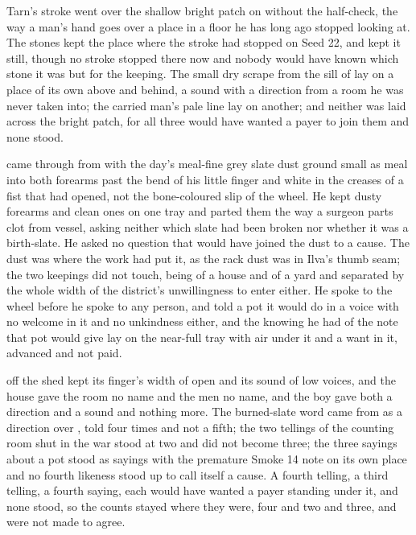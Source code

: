 \scenebreak

Tarn's stroke went over the shallow bright patch on  without the half-check, the way a man's hand goes over a place in a floor he has long ago stopped looking at. The stones kept the place where the stroke had stopped on Seed 22, and kept it still, though no stroke stopped there now and nobody would have known which stone it was but for the keeping. The small dry scrape from the sill of  lay on a place of its own above and behind, a sound with a direction from a room he was never taken into; the carried man's pale line lay on another; and neither was laid across the bright patch, for all three would have wanted a payer to join them and none stood.

 came through from  with the day's meal-fine grey slate dust ground small as meal into both forearms past the bend of his little finger and white in the creases of a fist that had opened, not the bone-coloured slip of the wheel. He kept dusty forearms and clean ones on one tray and parted them the way a surgeon parts clot from vessel, asking neither which slate had been broken nor whether it was a birth-slate. He asked no question that would have joined the dust to a cause. The dust was where the work had put it, as the rack dust was in Ilva's thumb seam; the two keepings did not touch, being of a house and of a yard and separated by the whole width of the district's unwillingness to enter either. He spoke to the wheel before he spoke to any person, and told a pot it would do in a voice with no welcome in it and no unkindness either, and the knowing he had of the note that pot would give lay on the near-full tray with air under it and a want in it, advanced and not paid.

 off the shed kept its finger's width of open and its sound of low voices, and the house gave the room no name and the men no name, and the boy gave both a direction and a sound and nothing more. The burned-slate word came from  as a direction over , told four times and not a fifth; the two tellings of the counting room shut in the war stood at two and did not become three; the three sayings about a pot stood as sayings with the premature Smoke 14 note on its own place and no fourth likeness stood up to call itself a cause. A fourth telling, a third telling, a fourth saying, each would have wanted a payer standing under it, and none stood, so the counts stayed where they were, four and two and three, and were not made to agree.

